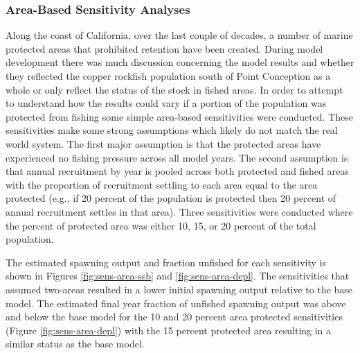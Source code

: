 \documentclass[11pt,
  english,
  a4paper,
]{article}
\begin{document}
\leavevmode\tagmcend\tagstructend\par


\hypertarget{area-based-sensitivity-analyses}{%
\subsubsection{Area-Based Sensitivity Analyses}\label{area-based-sensitivity-analyses}}

\leavevmode\tagmcend\tagstructend


Along the coast of California, over the last couple of decades, a number of marine protected areas that prohibited retention have been created. During model development there was much discussion concerning the model results and whether they reflected the copper rockfish population south of Point Conception as a whole or only reflect the status of the stock in fished areas. In order to attempt to understand how the results could vary if a portion of the population was protected from fishing some simple area-based sensitivities were conducted. These sensitivities make some strong assumptions which likely do not match the real world system. The first major assumption is that the protected areas have experienced no fishing pressure across all model years. The second assumption is that annual recruitment by year is pooled across both protected and fished areas with the proportion of recruitment settling to each area equal to the area protected (e.g., if 20 percent of the population is protected then 20 percent of annual recruitment settles in that area). Three sensitivities were conducted where the percent of protected area was either 10, 15, or 20 percent of the total population.

\leavevmode\tagmcend\tagstructend\par


The estimated spawning output and fraction unfished for each sensitivity is shown in Figures \ref{fig:sens-area-ssb} and \ref{fig:sens-area-depl}. The sensitivities that assumed two-areas resulted in a lower initial spawning output relative to the base model. The estimated final year fraction of unfished spawning output was above and below the base model for the 10 and 20 percent area protected sensitivities (Figure \ref{fig:sens-area-depl}) with the 15 percent protected area resulting in a similar status as the base model.
\end{document}
